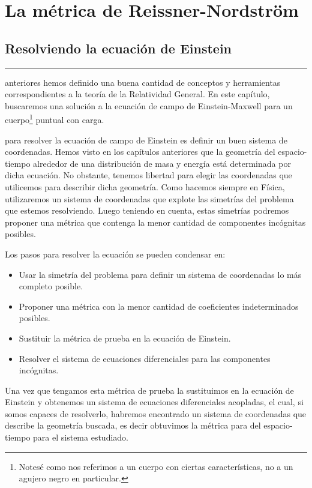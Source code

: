 \chapter{\textcolor{myred}{La métrica de Reissner-Nordström}}


\section{\huge{Resolviendo la ecuación de Einstein}}

\textcolor{myred}{\hrule}

 anteriores hemos definido una buena cantidad de conceptos y herramientas correspondientes a la teoría de la Relatividad General. En este capítulo, buscaremos una solución a la ecuación de campo de Einstein-Maxwell para un cuerpo\footnote{Notesé como nos referimos a un cuerpo con ciertas características, no a un agujero negro en particular.} puntual con carga. 

 para resolver la ecuación de campo de Einstein es definir un buen sistema de coordenadas. Hemos visto en los capítulos anteriores que la geometría del espacio-tiempo alrededor de una distribución de masa y energía está determinada por dicha ecuación. No obstante, tenemos libertad para elegir las coordenadas que utilicemos para describir dicha geometría. Como hacemos siempre en Física, utilizaremos un sistema de coordenadas que explote las simetrías del problema que estemos resolviendo. Luego teniendo en cuenta, estas simetrías podremos proponer una métrica que contenga la menor cantidad de componentes incógnitas posibles.
\begin{marginfigure}
\begin{extrabox}{}
Los pasos para resolver la ecuación se pueden condensar en:
\begin{itemize}
    \item Usar la simetría del problema para definir un sistema de coordenadas lo más completo posible.
    \item Proponer una métrica con la menor cantidad de coeficientes indeterminados posibles.
    \item Sustituir la métrica de prueba en la ecuación de Einstein.
    \item Resolver el sistema de ecuaciones diferenciales para las componentes incógnitas.
\end{itemize}
\end{extrabox}
\end{marginfigure}
Una vez que tengamos esta métrica de prueba la sustituimos en la ecuación de Einstein y obtenemos un sistema de ecuaciones diferenciales acopladas, el cual, si somos capaces de resolverlo, habremos encontrado un sistema de coordenadas que describe la geometría buscada, es decir obtuvimos la métrica para del  espacio-tiempo para el sistema estudiado.

